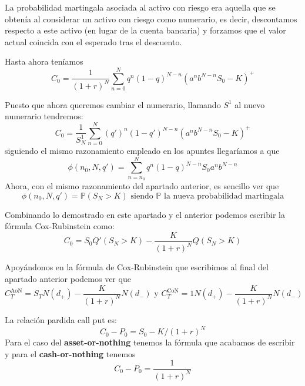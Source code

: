 \begin{problem}[1]
\spart

La probabilidad martingala asociada al activo con riesgo era aquella que se obtenía al considerar un activo con riesgo como numerario, es decir, descontamos respecto a este activo (en lugar de la cuenta bancaria) y forzamos que el valor actual coincida con el esperado tras el descuento.

Hasta ahora teníamos
\[C_0 = \frac{1}{(1+r)^N}\sum_{n=0}^Nq^n(1-q)^{N-n}(a^nb^{N-n}S_0-K)^+\]

Puesto que ahora queremos cambiar el numerario, llamando $S^1$ al nuevo numerario tendremos:
\[C_0 = \frac{1}{S^1_N}\sum_{n=0}^N(q')^n(1-q')^{N-n}(a^nb^{N-n}S_0-K)^+\]
siguiendo el mismo razonamiento empleado en los apuntes llegaríamos a que
\[\phi(n_0,N,q') = \sum_{n=n_0}^Nq^n(1-q)^{N-n}S_0a^nb^{N-n}\]
Ahora, con el mismo razonamiento del apartado anterior, es sencillo ver que
\[\phi(n_0,N,q') = \mathbb{P}(S_N>K) \text{ siendo } \mathbb{P} \text{ la nueva probabilidad martingala}\]

Combinando lo demostrado en este apartado y el anterior podemos escribir la fórmula Cox-Rubinstein como:
\[C_0=S_0Q'(S_N>K) - \frac{K}{(1+r)^N}Q(S_N>K)\]

\spart

Apoyándonos en la fórmula de Cox-Rubinstein que escribimos al final del apartado anterior podemos ver que
\[C_T^{\text{AoN}}=S_TN(d_+)-\frac{K}{(1+r)^N}N(d_-) \text{ y } C_T^{\text{CoN}}=1N(d_+)-\frac{K}{(1+r)^N}N(d_-)\]

\spart

La relación pardida call put es:
\[C_0-P_0=S_0-K/(1+r)^N\]
Para el caso del \textbf{asset-or-nothing} tenemos la fórmula que acabamos de escribir y para el \textbf{cash-or-nothing} tenemos
\[C_0-P_0=\frac{1}{(1+r)^N}\]

\end{problem}

